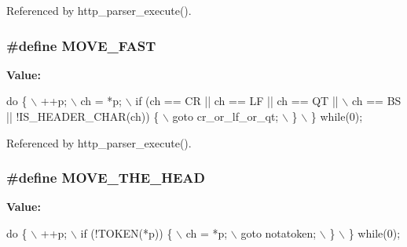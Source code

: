 Referenced by http\+\_\+parser\+\_\+execute().

\subsubsection[{M\+O\+V\+E\+\_\+\+F\+A\+ST}]{\setlength{\rightskip}{0pt plus 5cm}\#define M\+O\+V\+E\+\_\+\+F\+A\+ST}\label{http__parser__cpp_8cpp_ad82419f080d636ff66ff7eb10ea5a03e}
{\bfseries Value\+:}
\begin{DoxyCode}
\textcolor{keywordflow}{do} \{                    \(\backslash\)
              ++p;                                    \(\backslash\)
              ch = *p;                                \(\backslash\)
              if (ch == CR || ch == LF || ch == QT || \(\backslash\)
                  ch == BS || !IS_HEADER_CHAR(ch)) \{  \(\backslash\)
                goto cr\_or\_lf\_or\_qt;                  \(\backslash\)
              \}                                       \(\backslash\)
            \} \textcolor{keywordflow}{while}(0);
\end{DoxyCode}


Referenced by http\+\_\+parser\+\_\+execute().

\subsubsection[{M\+O\+V\+E\+\_\+\+T\+H\+E\+\_\+\+H\+E\+AD}]{\setlength{\rightskip}{0pt plus 5cm}\#define M\+O\+V\+E\+\_\+\+T\+H\+E\+\_\+\+H\+E\+AD}\label{http__parser__cpp_8cpp_a3bff473b0d409108fd42a712c7cdc3f7}
{\bfseries Value\+:}
\begin{DoxyCode}
\textcolor{keywordflow}{do} \{ \(\backslash\)
                ++p;                     \(\backslash\)
                if (!TOKEN(*p)) \{        \(\backslash\)
                  ch = *p;               \(\backslash\)
                  goto notatoken;        \(\backslash\)
                \}                        \(\backslash\)
              \} \textcolor{keywordflow}{while}(0);
\end{DoxyCode}


